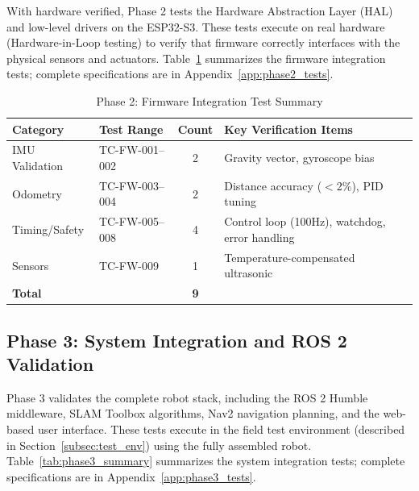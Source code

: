 With hardware verified, Phase 2 tests the Hardware Abstraction Layer (HAL) and low-level drivers on the ESP32-S3. These tests execute on real hardware (Hardware-in-Loop testing) to verify that firmware correctly interfaces with the physical sensors and actuators. Table~\ref{tab:phase2_summary} summarizes the firmware integration tests; complete specifications are in Appendix~\ref{app:phase2_tests}.

\begin{table}[H]
    \centering
    \caption{Phase 2: Firmware Integration Test Summary}
    \label{tab:phase2_summary}
    \begin{tabular}{@{}llcl@{}}
        \toprule
        \textbf{Category} & \textbf{Test Range} & \textbf{Count} & \textbf{Key Verification Items} \\
        \midrule
        IMU Validation & TC-FW-001--002 & 2 & Gravity vector, gyroscope bias \\
        Odometry & TC-FW-003--004 & 2 & Distance accuracy ($<$2\%), PID tuning \\
        Timing/Safety & TC-FW-005--008 & 4 & Control loop (100Hz), watchdog, error handling \\
        Sensors & TC-FW-009 & 1 & Temperature-compensated ultrasonic \\
        \midrule
        \textbf{Total} & & \textbf{9} & \\
        \bottomrule
    \end{tabular}
\end{table}

\subsection{Phase 3: System Integration and ROS 2 Validation}

Phase 3 validates the complete robot stack, including the ROS 2 Humble middleware, SLAM Toolbox algorithms, Nav2 navigation planning, and the web-based user interface. These tests execute in the field test environment (described in Section~\ref{subsec:test_env}) using the fully assembled robot. Table~\ref{tab:phase3_summary} summarizes the system integration tests; complete specifications are in Appendix~\ref{app:phase3_tests}.

